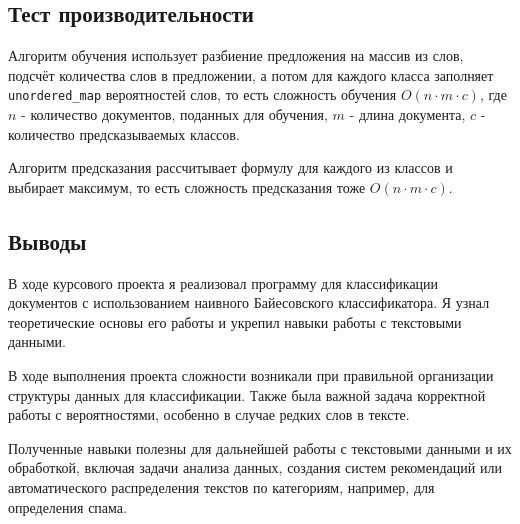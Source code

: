 \documentclass[12pt]{article}
\begin{document}
\newpage
\subsection*{Тест производительности}

Алгоритм обучения использует разбиение предложения на массив из слов, подсчёт количества слов в предложении, а потом для каждого класса
заполняет \texttt{unordered\_map} вероятностей слов, то есть сложность обучения $O(n \cdot m \cdot c)$, где $n$ - количество документов,
поданных для обучения, $m$ - длина документа, $c$ - количество предсказываемых классов.

Алгоритм предсказания рассчитывает формулу для каждого из классов и выбирает максимум, то есть сложность предсказания тоже $O(n \cdot m \cdot c)$.

\subsection*{Выводы}

В ходе курсового проекта я реализовал программу для классификации документов
с использованием наивного Байесовского классификатора.
Я узнал теоретические основы его работы и укрепил
навыки работы с текстовыми данными. 

В ходе выполнения проекта сложности возникали при правильной организации
структуры данных для классификации. Также была важной задача корректной работы
с вероятностями, особенно в случае редких слов в тексте.

Полученные навыки полезны для дальнейшей работы с текстовыми данными
и их обработкой, включая задачи анализа данных, создания систем рекомендаций
или автоматического распределения текстов по категориям, например, для определения спама.
\end{document}
